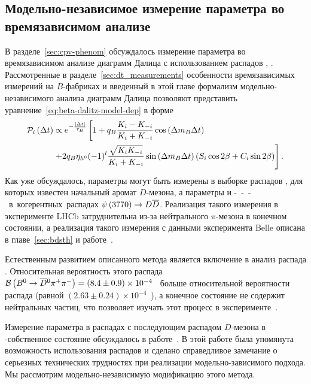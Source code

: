 \subsection{Модельно-независимое измерение параметра \pphi во времязависимом анализе}\label{sec:model-independent-beta}
В разделе~\ref{sec:cpv-phenom} обсуждалось измерение параметра \pphi во времязависимом анализе диаграмм Далица с использованием распадов \bdh, \dbkpp.  Рассмотренные в разделе~\ref{sec:dt_measurements} особенности времязависимых измерений на $B$-фабриках и введенный в этой главе формализм модельно-независимого анализа диаграмм Далица позволяют представить уравнение~\eqref{eq:beta-dalitz-model-dep} в форме
\begin{equation}\label{eq:master-formula}
 \begin{split}
  \mathcal{P}_i\left( \Delta t\right) &\propto e^{-\frac{\left|\Delta t\right|}{\tau_B}}\left[ 1 + q_B\frac{K_i-K_{-i}}{K_i+K_{-i}}\cos\left(\Delta m_B\Delta t\right)\right.\\
  &\left.+2q_B\eta_{h^0}(-1)^l\frac{\sqrt{K_iK_{-i}}}{K_i+K_{-i}}\sin\left(\Delta m_B\Delta t\right)\left(S_i\cos{2\ensuremath{\beta}}+C_i\sin{2\ensuremath{\beta}}\right)\right].
 \end{split}
 \end{equation} 
Как уже обсуждалось, параметры \ki могут быть измерены в выборке распадов \dnkpp, для которых известен начальный аромат $D$-мезона, а параметры \ci и \si --- в когерентных распадах $\psi\left(3770\right)\to D\overline{D}$.  Реализация такого измерения в эксперименте LHCb затруднительна из-за нейтрального $\pi$-мезона в конечном состоянии, а реализация такого измерения с данными эксперимента Belle описана в главе~\ref{sec:bdsth} и работе~\cite{belle_beta_binned_dalitz}.  

Естественным развитием описанного метода является включение в анализ распада \bdbpp.  Относительная вероятность этого распада $\mathcal{B}\left( B^0\to \overline{D}{}^0\pi^+\pi^-\right)  = \left( 8.4\pm0.9\right) \times 10^{-4}$~\cite{pdg} больше относительной вероятности распада \bdpi (равной $(2.63\pm0.24)\times 10^{-4}$~\cite{pdg}), а конечное состояние не содержит нейтральных частиц, что позволяет изучать этот процесс в эксперименте~\lhcb.  

Измерение параметра \cosdbeta в распадах \bdbpp с последующим распадом $D$-мезона в \cpconj-собственное состояние обсуждалось в работе~\cite{gershon_bdpp}.  В этой работе была упомянута возможность использования распадов \dnkpp и сделано справедливое замечание о серьезных технических трудностях при реализации модельно-зависимого подхода.  Мы рассмотрим модельно-независимую модификацию этого метода.  

